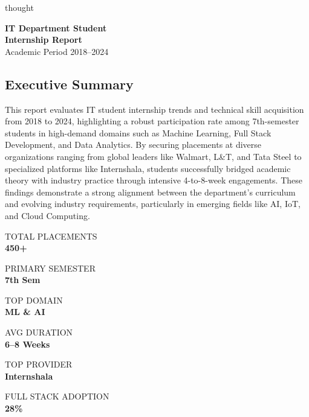 thought\documentclass[11pt,a4paper]{article}
\newcommand{\kpi}[2]{
    \begin{tcolorbox}[
        colback=lightblue,
        colframe=accent,
        boxrule=0.5pt,
        arc=2mm,
        center title
    ]
    \begin{center}
        \textcolor{muted}{\footnotesize\uppercase{#1}} \\
        \vspace{1mm}
        \textcolor{accent}{\Large\textbf{#2}}
    \end{center}
    \end{tcolorbox}
}
\begin{document}
\thispagestyle{empty}
\vspace*{2.5cm}

\begin{flushleft}
    {\Huge\textcolor{accent}{\textbf{IT Department Student\\Internship Report}}} \\
    \vspace{0.5cm}
    {\Large\textcolor{muted2}{Academic Period 2018--2024}}
\end{flushleft}

\vspace{1.5cm}

\begin{card}
    \subsection*{Executive Summary}
    This report evaluates IT student internship trends and technical skill acquisition from 2018 to 2024, highlighting a robust participation rate among 7th-semester students in high-demand domains such as Machine Learning, Full Stack Development, and Data Analytics. By securing placements at diverse organizations ranging from global leaders like Walmart, L\&T, and Tata Steel to specialized platforms like Internshala, students successfully bridged academic theory with industry practice through intensive 4-to-8-week engagements. These findings demonstrate a strong alignment between the department's curriculum and evolving industry requirements, particularly in emerging fields like AI, IoT, and Cloud Computing.
\end{card}

\vspace{1cm}

\begin{minipage}[t]{0.31\textwidth}
    \kpi{Total Placements}{450+}
\end{minipage}%
\hfill
\begin{minipage}[t]{0.31\textwidth}
    \kpi{Primary Semester}{7th Sem}
\end{minipage}%
\hfill
\begin{minipage}[t]{0.31\textwidth}
    \kpi{Top Domain}{ML \& AI}
\end{minipage}

\vspace{0.5cm}

\begin{minipage}[t]{0.31\textwidth}
    \kpi{Avg Duration}{6--8 Weeks}
\end{minipage}%
\hfill
\begin{minipage}[t]{0.31\textwidth}
    \kpi{Top Provider}{Internshala}
\end{minipage}%
\hfill
\begin{minipage}[t]{0.31\textwidth}
    \kpi{Full Stack Adoption}{28\%}
\end{minipage}
\end{document}
